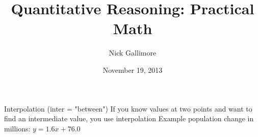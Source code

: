 \documentclass[]{article}
\begin{document}
\title{Quantitative Reasoning: Practical Math}

\author{Nick Gallimore}
\date{November 19, 2013}
\maketitle

Interpolation (inter = "between") 
If you know values at two points and want to find an intermediate value, you use 
interpolation \n
Example population change in millions:\newline\newline
$y=1.6x+76.0$
\end{document}
